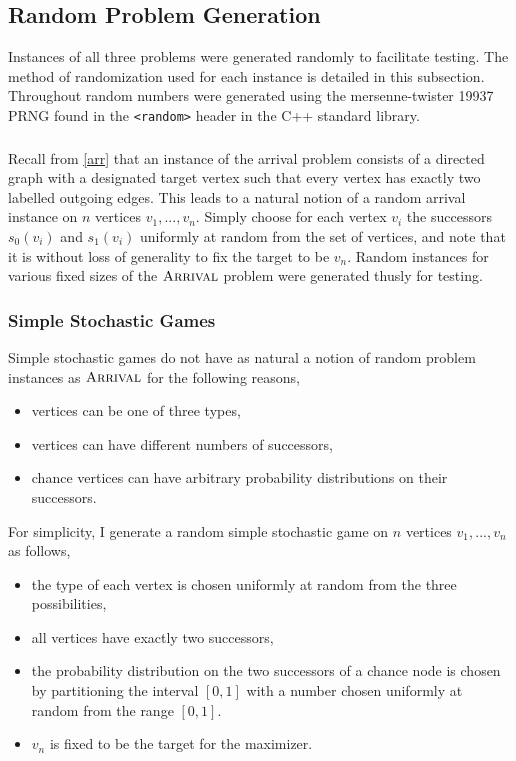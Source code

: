 \subsection{Random Problem Generation} \label{randomGen}
Instances of all three problems were generated randomly to facilitate testing. The method of randomization used
for each instance is detailed in this subsection. Throughout random numbers were generated using the mersenne-twister\citep{mersenne}
19937 PRNG found in 
the \lstinline{<random>} header in the C++ standard library.
\subsubsection{\arr} \label{arrRandom}
Recall from \cref{arr} that an instance of the arrival problem consists of a directed graph with
a designated target vertex such that every vertex has exactly two labelled outgoing edges.
This leads to a natural notion of a random arrival instance on $n$ vertices $v_1, ..., v_n$.
Simply choose for each vertex $v_i$ the successors $s_0(v_i)$ and $s_1(v_i)$ uniformly at random
from the set of vertices, and note that it is without loss of generality to fix the target to be $v_n$.
Random instances for various fixed sizes of the $\textsc{Arrival}$ problem were generated thusly for testing.

\subsubsection{Simple Stochastic Games} \label{ssgRandom}
Simple stochastic games do not have as natural a notion of random problem instances as $\textsc{Arrival}$ for the following reasons,
\begin{itemize}
  \item vertices can be one of three types, 
  \item vertices can have different numbers of successors,
  \item chance vertices can have arbitrary probability distributions on their successors.
\end{itemize}
For simplicity, I generate a random simple stochastic game on $n$ vertices $v_1, ..., v_n$ as follows,
\begin{itemize}
  \item the type of each vertex is chosen uniformly at random from the three possibilities,
  \item all vertices have exactly two successors,
  \item the probability distribution on the two successors of a chance node is chosen by
    partitioning the interval $[0, 1]$ with a number chosen uniformly at random from the range $[0, 1]$.
  \item $v_n$ is fixed to be the target for the maximizer.
\end{itemize}

